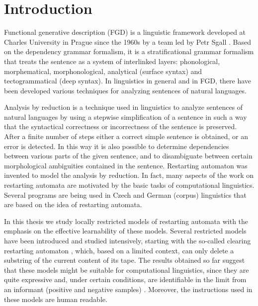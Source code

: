 \chapter*{Introduction}

\let\thefootnote\relax{}

Functional generative description (FGD) is a linguistic framework developed at Charles University in Prague since the 1960s by a team led by Petr Sgall \citep{SgNeGoHa69}. Based on the dependency grammar formalism, it is a stratificational grammar formalism that treats the sentence as a system of interlinked layers: phonological, morphematical, morphonological, analytical (surface syntax) and tectogrammatical (deep syntax). In linguistics in general and in FGD, there have been developed various techniques for analyzing sentences of natural languages.

Analysis by reduction \citep{LoPlKu05} is a technique used in linguistics to analyze sentences of natural languages by using a stepwise simplification of a sentence in such a way that the syntactical correctness or incorrectness of the sentence is preserved. After a finite number of steps either a correct simple sentence is obtained, or an error is detected. In this way it is also possible to determine dependencies between various parts of the given sentence, and to disambiguate between certain morphological ambiguities contained in the sentence. Restarting automaton \citep{JMPV95,O06} was invented to model the analysis by reduction. In fact, many aspects of the work on restarting automata are motivated by the basic tasks of computational linguistics. Several programs are being used in Czech and German (corpus) linguistics that are based on the idea of restarting automata.

In this thesis we study locally restricted models of restarting automata with the emphasis on the effective learnability of these models. Several restricted models have been introduced and studied intensively, starting with the so-called clearing restarting automaton \citep{CM10}, which, based on a limited context, can only delete a substring of the current content of its tape. The results obtained so far suggest that these models might be suitable for computational linguistics, since they are quite expressive and, under certain conditions, are identifiable in the limit from an informant (positive and negative samples) \citep{C12,C13}. Moreover, the instructions used in these models are human readable.

